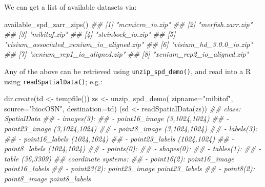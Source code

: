 \documentclass[
  letterpaper,
  DIV=11,
  numbers=noendperiod]{scrreprt}
\newenvironment{Shaded}{\begin{snugshade}}{\end{snugshade}}
\newcommand{\AttributeTok}[1]{\textcolor[rgb]{0.40,0.45,0.13}{#1}}
\newcommand{\DocumentationTok}[1]{\textcolor[rgb]{0.37,0.37,0.37}{\textit{#1}}}
\newcommand{\FunctionTok}[1]{\textcolor[rgb]{0.28,0.35,0.67}{#1}}
\newcommand{\NormalTok}[1]{\textcolor[rgb]{0.00,0.23,0.31}{#1}}
\newcommand{\OtherTok}[1]{\textcolor[rgb]{0.00,0.23,0.31}{#1}}
\newcommand{\StringTok}[1]{\textcolor[rgb]{0.13,0.47,0.30}{#1}}
\begin{document}
We can get a list of available datasets via:

\begin{Shaded}
\begin{Highlighting}[]
\FunctionTok{available\_spd\_zarr\_zips}\NormalTok{()}
\DocumentationTok{\#\#  [1] "mcmicro\_io.zip"                         }
\DocumentationTok{\#\#  [2] "merfish.zarr.zip"                       }
\DocumentationTok{\#\#  [3] "mibitof.zip"                            }
\DocumentationTok{\#\#  [4] "steinbock\_io.zip"                       }
\DocumentationTok{\#\#  [5] "visium\_associated\_xenium\_io\_aligned.zip"}
\DocumentationTok{\#\#  [6] "visium\_hd\_3.0.0\_io.zip"                 }
\DocumentationTok{\#\#  [7] "xenium\_rep1\_io\_aligned.zip"             }
\DocumentationTok{\#\#  [8] "xenium\_rep2\_io\_aligned.zip"}
\end{Highlighting}
\end{Shaded}

Any of the above can be retrieved using \texttt{unzip\_spd\_demo()}, and
read into a R using \texttt{readSpatialData()}; e.g.:

\begin{Shaded}
\begin{Highlighting}[]
\FunctionTok{dir.create}\NormalTok{(td }\OtherTok{\textless{}{-}} \FunctionTok{tempfile}\NormalTok{())}
\NormalTok{zs }\OtherTok{\textless{}{-}} \FunctionTok{unzip\_spd\_demo}\NormalTok{(}
    \AttributeTok{zipname=}\StringTok{"mibitof"}\NormalTok{, }
    \AttributeTok{source=}\StringTok{"biocOSN"}\NormalTok{,}
    \AttributeTok{destination=}\NormalTok{td)}
\NormalTok{(sd }\OtherTok{\textless{}{-}} \FunctionTok{readSpatialData}\NormalTok{(zs))}
\DocumentationTok{\#\#  class: SpatialData}
\DocumentationTok{\#\#  {-} images(3):}
\DocumentationTok{\#\#    {-} point16\_image (3,1024,1024)}
\DocumentationTok{\#\#    {-} point23\_image (3,1024,1024)}
\DocumentationTok{\#\#    {-} point8\_image (3,1024,1024)}
\DocumentationTok{\#\#  {-} labels(3):}
\DocumentationTok{\#\#    {-} point16\_labels (1024,1024)}
\DocumentationTok{\#\#    {-} point23\_labels (1024,1024)}
\DocumentationTok{\#\#    {-} point8\_labels (1024,1024)}
\DocumentationTok{\#\#  {-} points(0):}
\DocumentationTok{\#\#  {-} shapes(0):}
\DocumentationTok{\#\#  {-} tables(1):}
\DocumentationTok{\#\#    {-} table (36,3309)}
\DocumentationTok{\#\#  coordinate systems:}
\DocumentationTok{\#\#  {-} point16(2): point16\_image point16\_labels}
\DocumentationTok{\#\#  {-} point23(2): point23\_image point23\_labels}
\DocumentationTok{\#\#  {-} point8(2): point8\_image point8\_labels}
\end{Highlighting}
\end{Shaded}
\end{document}
